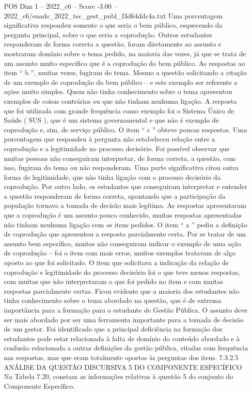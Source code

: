 \begin{textsample}{POS Dim 1 – 2022\_c6 – Score -3.00 – 2022\_c6/enade\_2022\_tec\_gest\_publ\_f3d64ddc4a.txt}
Uma porcentagem significativa respondeu somente o que seria o bem público, esquecendo da pergunta principal, sobre o que seria a coprodução.
Outros estudantes responderam de forma correta a questão, foram diretamente ao assunto e mostraram domínio sobre o tema pedido, na maioria das vezes, já que se trata de um assunto muito específico que é a coprodução do bem público.
As respostas ao item “ b ”, muitas vezes, fugiram do tema.
Mesmo a questão solicitando a citação de um exemplo de coprodução do bem público – e este exemplo ser referente a ações muito simples.
Quem não tinha conhecimento sobre o tema apresentou exemplos de coisas contrárias ou que não tinham nenhuma ligação.
A resposta que foi utilizada com grande frequência como exemplo foi o Sistema Único de Saúde ( SUS ), que é um sistema governamental e que não é exemplo de coprodução e, sim, de serviço público.
O item “ c ” obteve poucas respostas.
Uma porcentagem que respondeu à pergunta não estabeleceu relação entre a coprodução e a legitimidade no processo decisório.
Foi possível observar que muitas pessoas não conseguiram interpretar, de forma correta, a questão, com isso, fugiram do tema ou não responderam.
Uma parte significativa citou outra forma de legitimidade, que não tinha ligação com o processo decisório da coprodução.
Por outro lado, os estudantes que conseguiram interpretar e entender a questão responderam de forma correta, apontando que a participação da população tornava a tomada de decisão mais legítima.
As respostas apresentaram que a coprodução é um assunto pouco conhecido, muitas respostas apresentadas não tinham nenhuma ligação com os itens pedidos.
O item “ a ” pediu a definição de coprodução que apresentou a resposta parcialmente certa.
Por se tratar de um assunto bem específico, muitos não conseguiram indicar o exemplo de uma ação de coprodução – foi o item com mais erros, muitos exemplos tratavam de algo oposto ao que foi solicitado.
O item que solicitava a indicação da relação de coprodução e legitimidade do processo decisório foi o que teve menos respostas, com muitas que não interpretaram o que foi pedido no item e com muitas respostas parcialmente certas.
Ficou evidente que a maioria dos estudantes não tinha conhecimento sobre o tema abordado na questão, que é de extrema importância para a formação para o estudante de Gestão Pública.
O assunto deve ser mais abordado por ser uma ferramenta importante para a tomada de decisão de um gestor.
Foi identificado que a principal deficiência na formação dos estudantes pode estar relacionada à falta de domínio do conteúdo abordado e à confusão relacionada a outras definições da gestão pública, citadas com frequência nas respostas, mas que eram totalmente opostas às perguntas dos itens. 7.3.2.5 ANÁLISE DA QUESTÃO DISCURSIVA 5 DO COMPONENTE ESPECÍFICO Na Tabela 7.20, constam as informações relativas à questão 5 do conjunto do Componente Específico.

\end{textsample}
